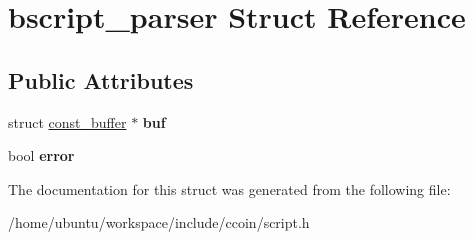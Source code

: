 \hypertarget{structbscript__parser}{\section{bscript\-\_\-parser Struct Reference}
\label{structbscript__parser}
}
\subsection*{Public Attributes}
\begin{DoxyCompactItemize}
\item 
\hypertarget{structbscript__parser_a9d0546d523facdd40b8fafba65fed25d}{struct \hyperlink{structconst__buffer}{const\-\_\-buffer} $\ast$ {\bfseries buf}}\label{structbscript__parser_a9d0546d523facdd40b8fafba65fed25d}

\item 
\hypertarget{structbscript__parser_a8e50a92e2efc7218a58ae378429538fd}{bool {\bfseries error}}\label{structbscript__parser_a8e50a92e2efc7218a58ae378429538fd}

\end{DoxyCompactItemize}


The documentation for this struct was generated from the following file\-:\begin{DoxyCompactItemize}
\item 
/home/ubuntu/workspace/include/ccoin/script.\-h\end{DoxyCompactItemize}
